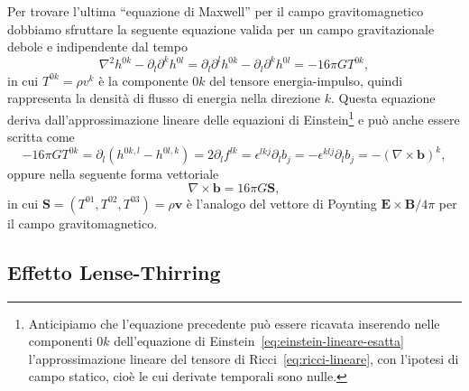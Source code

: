 Per trovare l'ultima ``equazione di Maxwell'' per il campo gravitomagnetico
dobbiamo sfruttare la seguente equazione valida per un campo gravitazionale
debole e indipendente dal tempo
\begin{equation}
  \nabla^{2}h^{0k} - \partial_{l}\partial^{k} h^{0l} = \partial_{l}\partial^{l}
  h^{0k} - \partial_{l}\partial^{k} h^{0l} = -16\pi GT^{0k},
\end{equation}
in cui $T^{0k} = \rho v^{k}$ è la componente $0k$ del tensore energia-impulso,
quindi rappresenta la densità di flusso di energia nella direzione $k$.  Questa
equazione deriva dall'approssimazione lineare delle equazioni di
Einstein\footnote{Anticipiamo che l'equazione precedente può essere ricavata
  inserendo nelle componenti $0k$ dell'equazione di
  Einstein~\eqref{eq:einstein-lineare-esatta} l'approssimazione lineare del
  tensore di Ricci~\eqref{eq:ricci-lineare}, con l'ipotesi di campo statico,
  cioè le cui derivate temporali sono nulle.}  e può anche essere scritta come
\begin{equation}
  -16\pi GT^{0k} = \partial_{l}(h^{0k,l} - h^{0l,k}) = 2\partial_{l}f^{lk} =
  \epsilon^{lkj}\partial_{l}b_{j} = -\epsilon^{klj}\partial_{l}b_{j} = -(\nabla
  \times \bm{b})^{k},
\end{equation}
oppure nella seguente forma vettoriale
\begin{equation}
  \nabla \times \bm{b} = 16\pi G \bm{S},
\end{equation}
in cui $\bm{S} = (T^{01}, T^{02}, T^{03}) = \rho \bm{v}$ è l'analogo del
vettore di Poynting $\bm{E}\times\bm{B}/4\pi$ per il
campo gravitomagnetico.

\subsection{Effetto Lense-Thirring}
\label{sec:effetto-lense-thirring}

